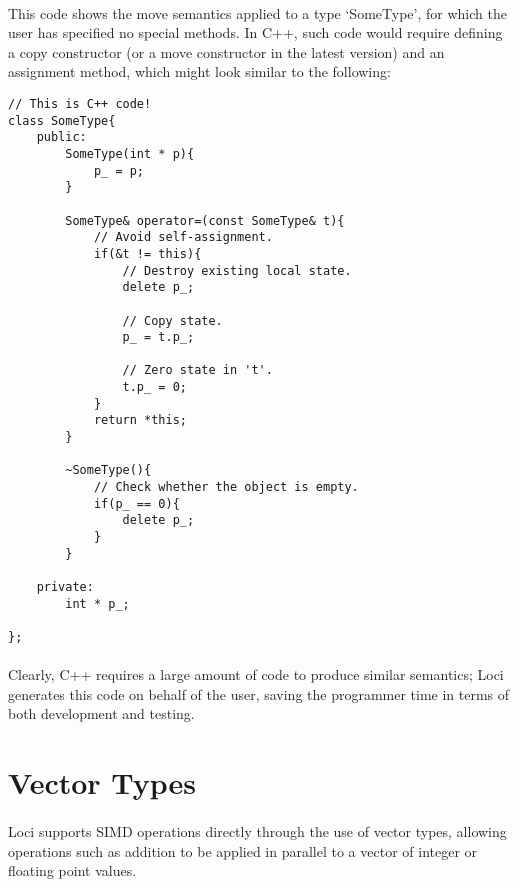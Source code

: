 \documentclass[12pt,twoside,notitlepage]{report}
\begin{document}
\paragraph{}
This code shows the move semantics applied to a type `SomeType', for which the user has specified no special methods. In C++, such code would require defining a copy constructor (or a move constructor in the latest version) and an assignment method, which might look similar to the following:

\small{
\begin{verbatim}
// This is C++ code!
class SomeType{
    public:
        SomeType(int * p){
            p_ = p;
        }
        
        SomeType& operator=(const SomeType& t){
            // Avoid self-assignment.
            if(&t != this){
                // Destroy existing local state.
                delete p_;
                
                // Copy state.
                p_ = t.p_;
                
                // Zero state in 't'.
                t.p_ = 0;
            }
            return *this;
        }
        
        ~SomeType(){
            // Check whether the object is empty.
            if(p_ == 0){
                delete p_;
            }
        }
    
    private:
        int * p_;
    
};
\end{verbatim}
}

\paragraph{}
Clearly, C++ requires a large amount of code to produce similar semantics; Loci generates this code on behalf of the user, saving the programmer time in terms of both development and testing.

\section{Vector Types}

\paragraph{}
Loci supports SIMD operations directly through the use of vector types, allowing operations such as addition to be applied in parallel to a vector of integer or floating point values.
\end{document}
